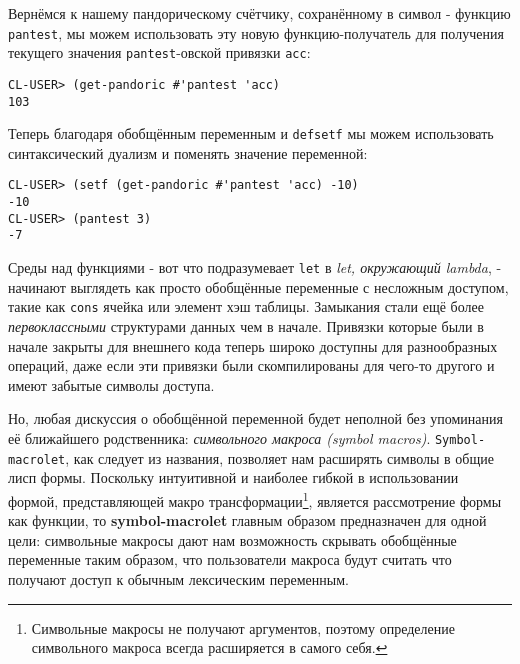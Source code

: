 Вернёмся к нашему пандорическому счётчику, сохранённому в символ - функцию \verb"pantest", мы можем использовать эту новую функцию-получатель для получения текущего значения \verb"pantest"-овской привязки \verb"acc":

\begin{verbatim}
CL-USER> (get-pandoric #'pantest 'acc)
103
\end{verbatim}

Теперь благодаря обобщённым переменным и \verb"defsetf" мы можем использовать синтаксический дуализм и поменять значение переменной:

\begin{verbatim}
CL-USER> (setf (get-pandoric #'pantest 'acc) -10)
-10
CL-USER> (pantest 3)
-7
\end{verbatim}

Среды над функциями - вот что подразумевает \verb"let" в \emph{let, окружающий lambda}, - начинают выглядеть как просто обобщённые переменные с несложным доступом, такие как \verb"cons" ячейка или элемент хэш таблицы. Замыкания стали ещё более \emph{первоклассными} структурами данных чем в начале. Привязки которые были в начале закрыты для внешнего кода теперь широко доступны для разнообразных операций, даже если эти привязки были скомпилированы для чего-то другого и имеют забытые символы доступа.

Но, любая дискуссия о обобщённой переменной будет неполной без упоминания её ближайшего родственника: \emph{символьного макроса (symbol macros)}. \verb"Symbol-macrolet", как следует из названия, позволяет нам расширять символы в общие лисп формы. Поскольку интуитивной и наиболее гибкой в использовании формой, представляющей макро трансформации\footnote{Символьные макросы не получают аргументов, поэтому определение символьного макроса всегда расширяется в самого себя.}, является рассмотрение формы как функции, то \textbf{sym\-bol\--\-mac\-ro\-let} главным образом предназначен для одной цели: символьные макросы дают нам возможность скрывать обобщённые переменные таким образом, что пользователи макроса будут считать что получают доступ к обычным лексическим переменным.



